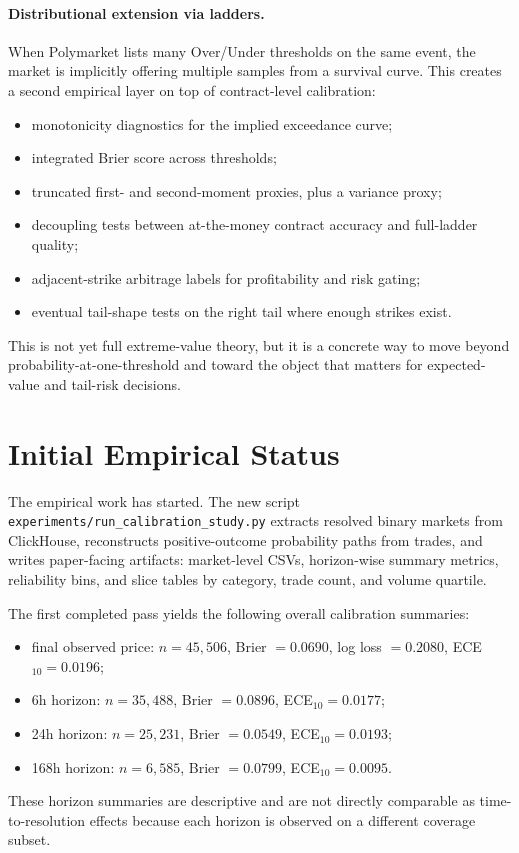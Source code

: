 \documentclass[10pt]{article}
\begin{document}
\paragraph{Distributional extension via ladders.}
When Polymarket lists many Over/Under thresholds on the same event, the market
is implicitly offering multiple samples from a survival curve. This creates a
second empirical layer on top of contract-level calibration:
\begin{itemize}[leftmargin=1.5em,itemsep=0.2em]
  \item monotonicity diagnostics for the implied exceedance curve;
  \item integrated Brier score across thresholds;
  \item truncated first- and second-moment proxies, plus a variance proxy;
  \item decoupling tests between at-the-money contract accuracy and full-ladder quality;
  \item adjacent-strike arbitrage labels for profitability and risk gating;
  \item eventual tail-shape tests on the right tail where enough strikes exist.
\end{itemize}
This is not yet full extreme-value theory, but it is a concrete way to move
beyond probability-at-one-threshold and toward the object that matters for
expected-value and tail-risk decisions.

\section{Initial Empirical Status}

The empirical work has started. The new script
\texttt{experiments/run\_calibration\_study.py} extracts resolved binary markets
from ClickHouse, reconstructs positive-outcome probability paths from trades,
and writes paper-facing artifacts: market-level CSVs, horizon-wise summary
metrics, reliability bins, and slice tables by category, trade count, and
volume quartile.

The first completed pass yields the following overall calibration summaries:
\begin{itemize}[leftmargin=1.5em,itemsep=0.2em]
  \item final observed price: $n=45{,}506$, Brier $=0.0690$,
  log loss $=0.2080$, ECE$_{10}=0.0196$;
  \item 6h horizon: $n=35{,}488$, Brier $=0.0896$,
  ECE$_{10}=0.0177$;
  \item 24h horizon: $n=25{,}231$, Brier $=0.0549$,
  ECE$_{10}=0.0193$;
  \item 168h horizon: $n=6{,}585$, Brier $=0.0799$,
  ECE$_{10}=0.0095$.
\end{itemize}
These horizon summaries are descriptive and are not directly comparable as
time-to-resolution effects because each horizon is observed on a different
coverage subset.
\end{document}
